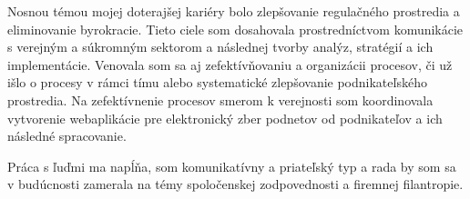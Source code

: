 

\begin{cvparagraph}

Nosnou témou mojej doterajšej kariéry bolo zlepšovanie regulačného prostredia a eliminovanie byrokracie. Tieto ciele som dosahovala prostredníctvom komunikácie s verejným a súkromným sektorom a následnej tvorby analýz, stratégií a ich implementácie. Venovala som sa aj zefektívňovaniu a organizácii procesov, či už išlo o procesy v rámci tímu alebo systematické zlepšovanie podnikateľského prostredia. Na zefektívnenie procesov smerom k verejnosti som koordinovala vytvorenie webaplikácie pre elektronický zber podnetov od podnikateľov a ich následné spracovanie.

Práca s ľuďmi ma napĺňa, som komunikatívny a priateľský typ a rada by som sa v budúcnosti zamerala na témy spoločenskej zodpovednosti a firemnej filantropie.
\end{cvparagraph}
